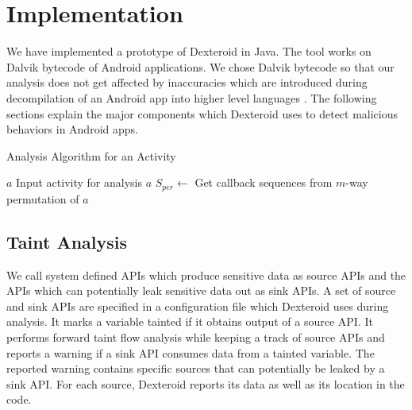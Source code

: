 \documentclass[10pt]{elsarticle}
\begin{document}
\section{Implementation}

We have implemented a prototype of Dexteroid in Java. The tool works on Dalvik bytecode of Android applications. We chose Dalvik bytecode \cite{dalvikForm, DalvikByteCode} so that our analysis does not get affected by inaccuracies which are introduced during decompilation of an Android app into higher level languages \cite{BadAndroidDecompiler, Georgiev2012}. The following sections explain the major components which Dexteroid uses to detect malicious behaviors in Android apps.



\begin{algorithm}
\caption{Analysis Algorithm for an Activity}\label{activityAnalyzer}
\begin{algorithmic}[1]
\INPUT
\Statex $a$ \Comment Input activity for analysis
 {$a$}
	\State $S_{per} \leftarrow$ Get callback sequences from $m$-way permutation of $a$
		\EndFor		
	\EndFor	
\EndProcedure
\end{algorithmic}
\end{algorithm}

\subsection {Taint Analysis} \label{taintAnalysisSec}

We call system defined APIs which produce sensitive data as source APIs and the APIs which can potentially leak sensitive data out as sink APIs. A set of source and sink APIs are specified in a configuration file which Dexteroid uses during analysis. It marks a variable tainted if it obtains output of a source API. It performs forward taint flow analysis while keeping a track of source APIs and reports a warning if a sink API consumes data from a tainted variable. The reported warning contains specific sources that can potentially be leaked by a sink API. For each source, Dexteroid reports its data as well as its location in the code.
\end{document}

